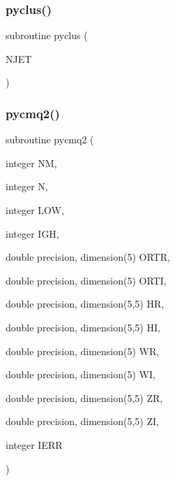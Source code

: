 \mbox{\label{pythia-6_84_824_8f_ac823bfab0c9338203123a1cab68ea330}} 
\subsubsection{\texorpdfstring{pyclus()}{pyclus()}}
{\footnotesize\ttfamily subroutine pyclus (\begin{DoxyParamCaption}\item[{}]{N\+J\+ET }\end{DoxyParamCaption})}

\mbox{\label{pythia-6_84_824_8f_a221a1006fd5f50c86615e419ce6a5c67}} 
\subsubsection{\texorpdfstring{pycmq2()}{pycmq2()}}
{\footnotesize\ttfamily subroutine pycmq2 (\begin{DoxyParamCaption}\item[{integer}]{NM,  }\item[{integer}]{N,  }\item[{integer}]{L\+OW,  }\item[{integer}]{I\+GH,  }\item[{double precision, dimension(5)}]{O\+R\+TR,  }\item[{double precision, dimension(5)}]{O\+R\+TI,  }\item[{double precision, dimension(5,5)}]{HR,  }\item[{double precision, dimension(5,5)}]{HI,  }\item[{double precision, dimension(5)}]{WR,  }\item[{double precision, dimension(5)}]{WI,  }\item[{double precision, dimension(5,5)}]{ZR,  }\item[{double precision, dimension(5,5)}]{ZI,  }\item[{integer}]{I\+E\+RR }\end{DoxyParamCaption})}

\mbox{\label{pythia-6_84_824_8f_a13d9dca91a2ba931501b34c8d124f207}} 
